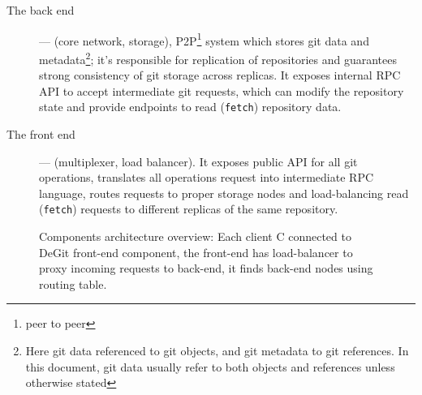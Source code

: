 \documentclass[acmlarge, screen, nonacm]{acmart}
\newcommand{\code}[1]{\texttt{#1}}
\begin{document}
\begin{description}
  \item[The back end] --- (core network, storage), P2P\footnote{peer to peer} system which stores git data
    and metadata\footnote{Here git data referenced to git objects, and git metadata to git references.
    In this document, git data usually refer to both objects and references unless otherwise stated};
    it's responsible for replication of repositories and guarantees
    strong consistency of git storage across replicas. It exposes internal RPC API to accept intermediate git 
    requests, which can modify the repository state and provide endpoints to read (\code{fetch}) repository data.
  \item[The front end] --- (multiplexer, load balancer). It exposes public API for all git operations,
    translates all operations request into intermediate RPC language, routes requests to proper storage
    nodes and load-balancing read (\code{fetch}) requests to different replicas of the same repository.
\end{description}

\begin{figure}
  \begin{center}
  \end{center}
  \caption{
    Components architecture overview:
    Each client C connected to DeGit front-end component,
    the front-end has load-balancer to proxy incoming requests to back-end,
    it finds back-end nodes using routing table.
  }\label{fig:comp-arc-overview}
\end{figure}
\end{document}
